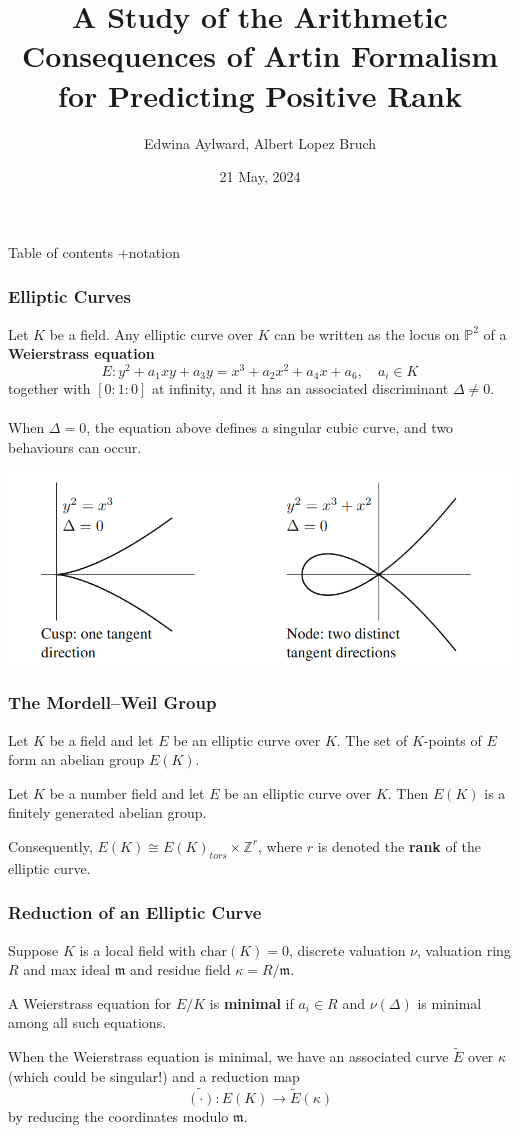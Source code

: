 \documentclass{beamer}
\title[Artin Formalism]{A Study of the Arithmetic Consequences of Artin Formalism for
Predicting Positive Rank}
\author{Edwina Aylward, Albert Lopez Bruch}
\date{21 May, 2024}
\newcommand{\ZZ}{\mathbb{Z}}
\theoremstyle{plain}
\begin{document}
\frame{\titlepage}

\begin{frame}{Table of contents}
    +notation
\end{frame}

\begin{frame}
    \frametitle{Elliptic Curves}
    Let $K$ be a field. Any elliptic curve over $K$ can be written as the locus on $\mathbb{P}^2$ of a \textbf{Weierstrass equation}
    \begin{equation}
        E:y^2+a_1xy+a_3y=x^3+a_2x^2+a_4x+a_6,\quad a_i\in K
    \end{equation}
    together with $[0:1:0]$ at infinity, and it has an associated discriminant $\Delta\neq0$. 
    \\~\\
    When $\Delta=0$, the equation above defines a singular cubic curve, and two behaviours can occur.
    
    \centering
    \includegraphics[scale=0.4]{Singular_cubic.png}
\end{frame}

\begin{frame}
    \frametitle{The Mordell--Weil Group}
    Let $K$ be a field and let $E$ be an elliptic curve over $K$. The set of $K$-points of $E$ form an abelian group $E(K)$. 
    \begin{theorem}
        Let $K$ be a number field and let $E$ be an elliptic curve over $K$. Then $E(K)$ is a finitely generated abelian group.
    \end{theorem}
    Consequently, $E(K)\cong E(K)_{tors}\times\ZZ^r$, where $r$ is denoted the \textbf{rank} of the elliptic curve.

\end{frame}

\begin{frame}
    \frametitle{Reduction of an Elliptic Curve}
    Suppose $K$ is a local field with $\mathrm{char}(K)=0$, discrete valuation $\nu$, valuation ring $R$ and max ideal $\mathfrak{m}$ and residue field $\kappa=R/\mathfrak{m}$.
    \begin{definition}
        A Weierstrass equation for $E/K$ is \textbf{minimal} if $a_i\in R$ and $\nu(\Delta)$ is minimal among all such equations.
    \end{definition}
    When the Weierstrass equation is minimal, we have an associated curve $\tilde{E}$ over $\kappa$ (which could be singular!) and a reduction map 
    $$\widetilde{(\cdot)}:E(K)\longrightarrow \tilde{E}(\kappa)$$
    by reducing the coordinates modulo $\mathfrak{m}$.
\end{frame}
\end{document}
